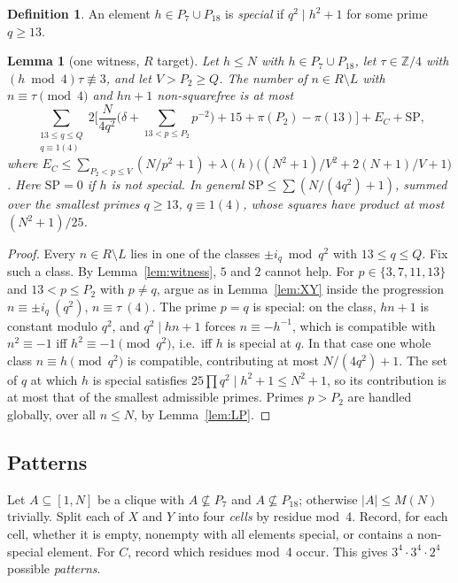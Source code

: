 \documentclass[11pt]{amsart}
\newtheorem{lemma}[theorem]{Lemma}
\theoremstyle{definition}
\newtheorem{definition}[theorem]{Definition}
\theoremstyle{remark}
\begin{document}
\begin{definition}
An element $h\in P_7\cup P_{18}$ is \emph{special} if $q^2\mid h^2+1$ for some prime $q\ge13$.
\end{definition}

\begin{lemma}[one witness, $R$ target]\label{lem:C}
Let $h\le N$ with $h\in P_7\cup P_{18}$, let $\tau\in\mathbb Z/4$ with $(h\bmod 4)\tau\not\equiv3$, and let
$V>P_2\ge Q$. The number of $n\in R\setminus L$ with $n\equiv\tau\pmod 4$ and $hn+1$ non-squarefree is at most
\[
\sum_{\substack{13\le q\le Q\\ q\equiv1(4)}}2\Big[\frac{N}{4q^2}\Big(\delta+\!\!\sum_{13<p\le P_2}\!\!p^{-2}\Big)+15+\pi(P_2)-\pi(13)\Big]
+E_C+\mathrm{SP},
\]
where $E_C\le\sum_{P_2<p\le V}(N/p^2+1)+\lambda(h)\big((N^2+1)/V^2+2(N+1)/V+1\big)$. Here $\mathrm{SP}=0$ if $h$
is not special. In general $\mathrm{SP}\le\sum(N/(4q^2)+1)$, summed over the smallest primes
$q\ge13$, $q\equiv1(4)$, whose squares have product at most $(N^2+1)/25$.
\end{lemma}
\begin{proof}
Every $n\in R\setminus L$ lies in one of the classes $\pm i_q\bmod q^2$ with $13\le q\le Q$. Fix such a class.
By Lemma~\ref{lem:witness}, $5$ and $2$ cannot help. For $p\in\{3,7,11,13\}$ and $13<p\le P_2$ with $p\ne q$,
argue as in Lemma~\ref{lem:XY} inside the progression $n\equiv\pm i_q\ (q^2)$, $n\equiv\tau\ (4)$. The prime
$p=q$ is special: on the class, $hn+1$ is constant modulo $q^2$, and $q^2\mid hn+1$ forces
$n\equiv-h^{-1}$, which is compatible with $n^2\equiv-1$ iff $h^2\equiv-1\pmod{q^2}$, i.e.\ iff $h$ is special
at $q$. In that case one whole class $n\equiv h\pmod{q^2}$ is compatible, contributing at most
$N/(4q^2)+1$. The set of $q$ at which $h$ is special satisfies $25\prod q^2\mid h^2+1\le N^2+1$, so its
contribution is at most that of the smallest admissible primes. Primes $p>P_2$ are handled globally, over all
$n\le N$, by Lemma~\ref{lem:LP}.
\end{proof}

\subsection{Patterns}
Let $A\subseteq[1,N]$ be a clique with $A\not\subseteq P_7$ and $A\not\subseteq P_{18}$; otherwise
$|A|\le M(N)$ trivially. Split each of $X$ and $Y$ into four \emph{cells} by residue mod~4. Record, for each
cell, whether it is empty, nonempty with all elements special, or contains a non-special element. For $C$,
record which residues mod~4 occur. This gives $3^4\cdot3^4\cdot2^4$ possible \emph{patterns}.
\end{document}
